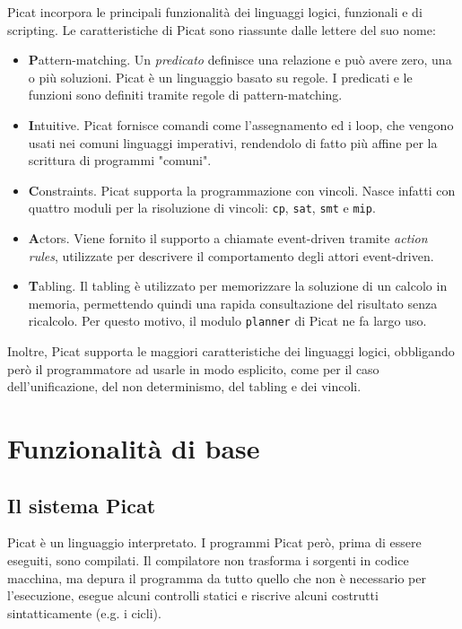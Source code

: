 \documentclass[12pt,a4paper,openright]{book} %
\begin{document}
Picat incorpora le principali funzionalità dei linguaggi logici, funzionali e di scripting. Le caratteristiche di Picat sono riassunte dalle lettere del suo nome:
\begin{itemize}
\item \textbf{P}attern-matching. Un \emph{predicato} definisce una relazione e può avere zero, una o più soluzioni. Picat è un linguaggio basato su regole. I predicati e le funzioni sono definiti tramite regole di pattern-matching.
\item \textbf{I}ntuitive. Picat fornisce comandi come l'assegnamento ed i loop, che vengono usati nei comuni linguaggi imperativi, rendendolo di fatto più affine per la scrittura di programmi "comuni".
\item \textbf{C}onstraints. Picat supporta la programmazione con vincoli. Nasce infatti con quattro moduli per la risoluzione di vincoli: \verb|cp|, \verb|sat|, \verb|smt| e \verb|mip|.
\item \textbf{A}ctors. Viene fornito il supporto a chiamate event-driven tramite \emph{action rules}, utilizzate per descrivere il comportamento degli attori event-driven.
\item \textbf{T}abling. Il tabling è utilizzato per memorizzare la soluzione di un calcolo in memoria, permettendo quindi una rapida consultazione del risultato senza ricalcolo. Per questo motivo, il modulo \verb|planner| di Picat ne fa largo uso. 
\end{itemize}

Inoltre, Picat supporta le maggiori caratteristiche dei linguaggi logici, obbligando però il programmatore ad usarle in modo esplicito, come per il caso dell'unificazione, del non determinismo, del tabling e dei vincoli.

\section{Funzionalità di base}
\label{sec:picat_base}

\subsection{Il sistema Picat}
\label{sec:picat_base_system}

Picat è un linguaggio interpretato. I programmi Picat però, prima di essere eseguiti, sono compilati. Il compilatore non trasforma i sorgenti in codice macchina, ma depura il programma da tutto quello che non è necessario per l'esecuzione, esegue alcuni controlli statici e riscrive alcuni costrutti sintatticamente (e.g. i cicli).
\end{document}
